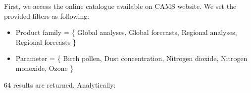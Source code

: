 \documentclass[9pt]{report}
\begin{document}
First, we access the online catalogue available on CAMS website.
We set the provided filters as following:%

\begin{itemize}%

\item{}
Product family = \{ Global analyses, Global forecasts, Regional analyses, Regional forecasts \}%

\item{}
Parameter = \{ Birch pollen, Dust concentration, Nitrogen dioxide, Nitrogen monoxide, Ozone \}%
\end{itemize}%

\noindent{}64 results are returned. Analytically:%
\end{document}

